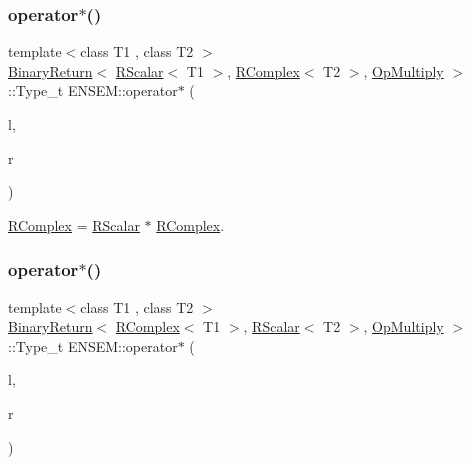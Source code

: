 \subsubsection{\texorpdfstring{operator$\ast$()}{operator*()}\hspace{0.1cm}{\footnotesize\ttfamily [2/3]}}
{\footnotesize\ttfamily template$<$class T1 , class T2 $>$ \\
\mbox{\hyperlink{structENSEM_1_1BinaryReturn}{Binary\+Return}}$<$ \mbox{\hyperlink{classENSEM_1_1RScalar}{R\+Scalar}}$<$ T1 $>$, \mbox{\hyperlink{classENSEM_1_1RComplex}{R\+Complex}}$<$ T2 $>$, \mbox{\hyperlink{structENSEM_1_1OpMultiply}{Op\+Multiply}} $>$\+::Type\+\_\+t E\+N\+S\+E\+M\+::operator$\ast$ (\begin{DoxyParamCaption}\item[{const \mbox{\hyperlink{classENSEM_1_1RScalar}{R\+Scalar}}$<$ T1 $>$ \&}]{l,  }\item[{const \mbox{\hyperlink{classENSEM_1_1RComplex}{R\+Complex}}$<$ T2 $>$ \&}]{r }\end{DoxyParamCaption})\hspace{0.3cm}{\ttfamily [inline]}}



\mbox{\hyperlink{classENSEM_1_1RComplex}{R\+Complex}} = \mbox{\hyperlink{classENSEM_1_1RScalar}{R\+Scalar}} $\ast$ \mbox{\hyperlink{classENSEM_1_1RComplex}{R\+Complex}}. 

\mbox{\label{group__rcomplex_gad99c4b787d010bff9c7b17d7c88e597a}} 
\subsubsection{\texorpdfstring{operator$\ast$()}{operator*()}\hspace{0.1cm}{\footnotesize\ttfamily [3/3]}}
{\footnotesize\ttfamily template$<$class T1 , class T2 $>$ \\
\mbox{\hyperlink{structENSEM_1_1BinaryReturn}{Binary\+Return}}$<$ \mbox{\hyperlink{classENSEM_1_1RComplex}{R\+Complex}}$<$ T1 $>$, \mbox{\hyperlink{classENSEM_1_1RScalar}{R\+Scalar}}$<$ T2 $>$, \mbox{\hyperlink{structENSEM_1_1OpMultiply}{Op\+Multiply}} $>$\+::Type\+\_\+t E\+N\+S\+E\+M\+::operator$\ast$ (\begin{DoxyParamCaption}\item[{const \mbox{\hyperlink{classENSEM_1_1RComplex}{R\+Complex}}$<$ T1 $>$ \&}]{l,  }\item[{const \mbox{\hyperlink{classENSEM_1_1RScalar}{R\+Scalar}}$<$ T2 $>$ \&}]{r }\end{DoxyParamCaption})\hspace{0.3cm}{\ttfamily [inline]}}



